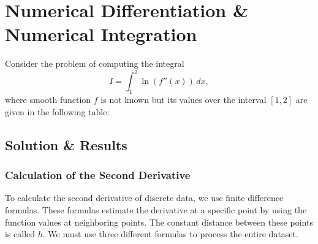 \newpage

\section{Numerical Differentiation \& Numerical Integration}

Consider the problem of computing the integral
\begin{equation}
    I = \int_{1}^{2} \ln(f''(x)) \, dx,
\end{equation}
where smooth function $f$ is not known but its values over the interval $[1, 2]$ are given in the following table:

\begin{center}
\end{center}  

\vspace{10pt}
\subsection{Solution \& Results}

\subsubsection{Calculation of the Second Derivative}

To calculate the second derivative of discrete data, we use finite difference formulas. These formulas estimate the derivative at a specific point by using the function values at neighboring points. The constant distance between these points is called $h$. We must use three different formulas to process the entire dataset.

